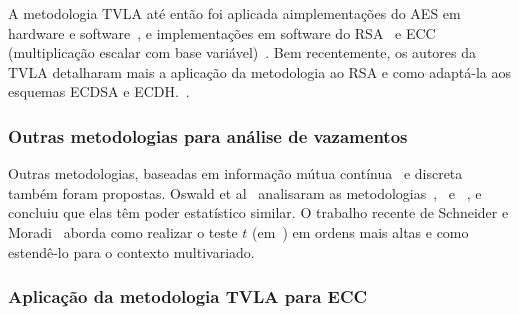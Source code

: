 \documentclass{SBCbookchapter}
\begin{document}
A metodologia TVLA até então foi aplicada aimplementações do AES em hardware e software~\cite{Goodwill2011,Cooper2013,MatherOswaldBandenburg2013}, e implementações em software do RSA~\cite{Witteman2011} e ECC (multiplicação escalar com base variável)~\cite{Nascimento2015_Space}. Bem recentemente, os autores da TVLA detalharam mais a aplicação da metodologia ao RSA e como adaptá-la aos esquemas ECDSA e ECDH.~\cite{TunstallGoodwill2016}.

\subsubsection{Outras metodologias para análise de vazamentos}

%
Outras metodologias, baseadas em informação mútua contínua~\cite{Chothia2011} e discreta~\cite{Chatzikokolakis2010} também foram propostas.
%
%
Oswald et al~\cite{MatherOswaldBandenburg2013} analisaram as metodologias~\cite{Goodwill2011},~\cite{Chatzikokolakis2010} e ~\cite{Chothia2011}, e concluiu que elas têm poder estatístico similar.
%
%
O trabalho recente de Schneider e Moradi~\cite{SchneiderM16} aborda como realizar o teste $t$ (em~\cite{Goodwill2011}) em ordens mais altas e como estendê-lo para o contexto multivariado.
%
\subsubsection{Aplicação da metodologia TVLA para ECC}
\end{document}
